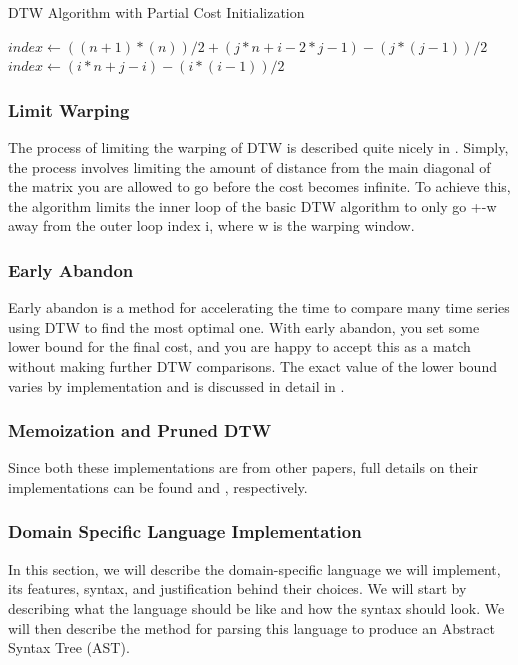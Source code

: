 \documentclass[sigconf,authordraft]{acmart}
\begin{document}
\begin{algorithm}
\caption{DTW Algorithm with Partial Cost Initialization}\label{alg:interleave}
\begin{algorithmic}

\State $index \gets ((n+1)*(n))/2 + (j*n + i - 2*j - 1) - (j*(j-1))/2$
\Else
\State $index \gets (i*n + j - i) - (i*(i-1))/2$
\EndIf

\end{algorithmic}
\end{algorithm}

\subsubsection{Limit Warping}
The process of limiting the warping of DTW is described quite nicely in \cite{SIG:AccelerateDTW}. Simply, the process involves limiting the amount of distance from the main diagonal of the matrix you are allowed to go before the cost becomes infinite. To achieve this, the algorithm limits the inner loop of the basic DTW algorithm to only go +-w away from the outer loop index i, where w is the warping window.

\subsubsection{Early Abandon}
Early abandon is a method for accelerating the time to compare many time series using DTW to find the most optimal one. With early abandon, you set some lower bound for the final cost, and you are happy to accept this as a match without making further DTW comparisons. The exact value of the lower bound varies by implementation and is discussed in detail in \cite{SIG:AccelerateDTW}.

\subsubsection{Memoization and Pruned DTW}
Since both these implementations are from other papers, full details on their implementations can be found \cite{SIG:AccelerateDTW} and \cite{SIG:PruneDTW}, respectively.

\subsubsection{Domain Specific Language Implementation}

In this section, we will describe the domain-specific language we will implement, its features, syntax, and justification behind their choices. We will start by describing what the language should be like and how the syntax should look. We will then describe the method for parsing this language to produce an Abstract Syntax Tree (AST).
\end{document}
